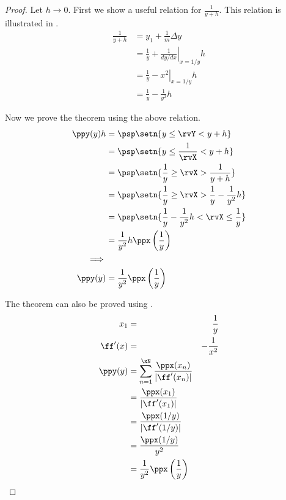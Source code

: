 \begin{proof}
Let $h\to0$.
First we show a useful relation for $\frac{1}{y+h}$.
This relation is illustrated in .
\begin{align*}
  \frac{1}{y+h}
    &=    y_1 + \frac{1}{m} \Delta y
  \\&=    \frac{1}{y} + \left.\frac{1}{dy/dx}\right|_{x=1/y} h
  \\&=    \frac{1}{y} - \left.x^2\right|_{x=1/y} h
  \\&=    \frac{1}{y} - \frac{1}{y^2} h
\end{align*}

Now we prove the theorem using the above relation.
\begin{align*}
  \ppy(y)h
    &=    \psp\setn{y\le\rvY < y+h}
  \\&=    \psp\setn{y\le \frac{1}{\rvX} < y+h}
  \\&=    \psp\setn{\frac{1}{y}\ge\rvX > \frac{1}{y+h}}
  \\&=    \psp\setn{\frac{1}{y}\ge\rvX > \frac{1}{y}-\frac{1}{y^2}h}
  \\&=    \psp\setn{\frac{1}{y}-\frac{1}{y^2}h < \rvX \le \frac{1}{y} }
  \\&=    \frac{1}{y^2}h \ppx\left( \frac{1}{y} \right)
\\\implies
\\
  \ppy(y)
    &=    \frac{1}{y^2} \ppx\left( \frac{1}{y} \right)
\end{align*}

The theorem can also be proved using .
\begin{align*}
  x_1 &=& \frac{1}{y} \\
  \ff'(x) &=& -\frac{1}{x^2}    \\
  \ppy(y)
    &= \sum_{n=1}^{\xN} \frac{\ppx(x_n)}{|\ff'(x_n)|}
  \\&= \frac{\ppx(x_1)}{|\ff'(x_1)|}
  \\&= \frac{\ppx(1/y)}{|\ff'(1/y)|}
  \\&= \frac{\ppx(1/y)}{y^2}
  \\&= \frac{1}{y^2} \ppx\left( \frac{1}{y} \right)
\end{align*}
\end{proof}





